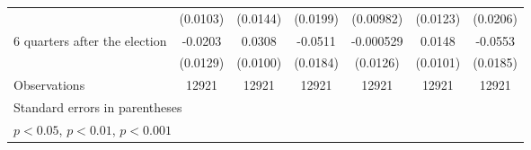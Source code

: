 \begin{table}[htbp]
\begin{tabular}{l*{6}{c}}
                    &    (0.0103)         &    (0.0144)         &    (0.0199)         &   (0.00982)         &    (0.0123)         &    (0.0206)         \\
[1em]
 6 quarters after the election&     -0.0203         &      0.0308\sym{**} &     -0.0511\sym{**} &   -0.000529         &      0.0148         &     -0.0553\sym{**} \\
                    &    (0.0129)         &    (0.0100)         &    (0.0184)         &    (0.0126)         &    (0.0101)         &    (0.0185)         \\
\hline
Observations        &       12921         &       12921         &       12921         &       12921         &       12921         &       12921         \\
\hline\hline
\multicolumn{7}{l}{\footnotesize Standard errors in parentheses}\\
\multicolumn{7}{l}{\footnotesize \sym{*} \(p<0.05\), \sym{**} \(p<0.01\), \sym{***} \(p<0.001\)}\\
\end{tabular}
\end{table}
